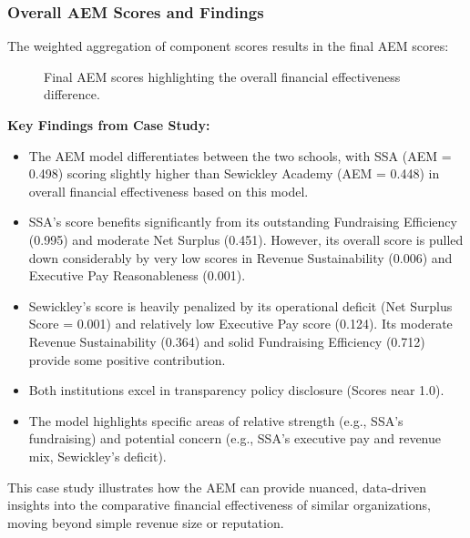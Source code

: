 \documentclass[12pt]{article}
\begin{document}
\subsubsection{Overall AEM Scores and Findings} %
The weighted aggregation of component scores results in the final AEM scores:
\begin{figure}[H]
\centering
{}
\caption{Final AEM scores highlighting the overall financial effectiveness difference.}
\label{fig:final_scores_detail}
\end{figure}

\textbf{Key Findings from Case Study:} %
\begin{itemize}
    \item The AEM model differentiates between the two schools, with SSA (AEM = 0.498) scoring slightly higher than Sewickley Academy (AEM = 0.448) in overall financial effectiveness based on this model.
    \item SSA's score benefits significantly from its outstanding Fundraising Efficiency (0.995) and moderate Net Surplus (0.451). However, its overall score is pulled down considerably by very low scores in Revenue Sustainability (0.006) and Executive Pay Reasonableness (0.001).
    \item Sewickley's score is heavily penalized by its operational deficit (Net Surplus Score = 0.001) and relatively low Executive Pay score (0.124). Its moderate Revenue Sustainability (0.364) and solid Fundraising Efficiency (0.712) provide some positive contribution.
    \item Both institutions excel in transparency policy disclosure (Scores near 1.0).
    \item The model highlights specific areas of relative strength (e.g., SSA's fundraising) and potential concern (e.g., SSA's executive pay and revenue mix, Sewickley's deficit).
\end{itemize}
This case study illustrates how the AEM can provide nuanced, data-driven insights into the comparative financial effectiveness of similar organizations, moving beyond simple revenue size or reputation.
\end{document}
